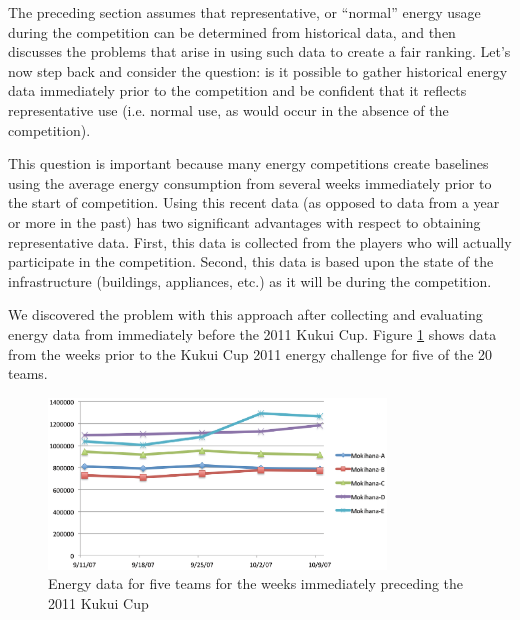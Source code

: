 \documentclass[jou]{apa} %
\begin{document}
The preceding section assumes that representative, or ``normal'' energy usage during the
competition can be determined from historical data, and then discusses the problems that
arise in using such data to create a fair ranking.  Let's now step back and consider the
question: is it possible to gather historical energy data immediately prior to the
competition and be confident that it reflects representative use (i.e. normal use, as
would occur in the absence of the competition). 

This question is important because many energy competitions create baselines using the
average energy consumption from several weeks immediately prior to the start of
competition.  Using this recent data (as opposed to data from a year or more in the past)
has two significant advantages with respect to obtaining representative data. First, this
data is collected from the players who will actually participate in the competition.
Second, this data is based upon the state of the infrastructure (buildings, appliances,
etc.) as it will be during the competition.

We discovered the problem with this approach after collecting and evaluating energy data
from immediately before the 2011 Kukui Cup. Figure
\ref{fig:kukuicup-baseline-data-chart} shows data from the weeks prior to the
Kukui Cup 2011 energy challenge for five of the 20 teams.

\begin{figure}[htbp]
\begin{center}
\includegraphics[width=0.8\textwidth]{kc-baselines.2.eps}
\caption{Energy data for five teams for the weeks immediately preceding the 2011 Kukui Cup}
\label{fig:kukuicup-baseline-data-chart}
\end{center}
\end{figure}

\end{document}

